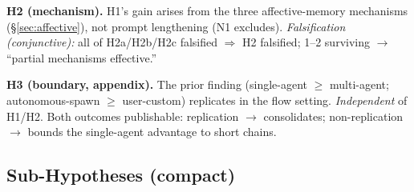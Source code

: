 \textbf{H2 (mechanism).} H1's gain arises from the three affective-memory mechanisms (\S\ref{sec:affective}), not prompt lengthening (N1 excludes). \emph{Falsification (conjunctive):} all of H2a/H2b/H2c falsified $\Rightarrow$ H2 falsified; 1--2 surviving $\to$ ``partial mechanisms effective.''

\textbf{H3 (boundary, appendix).} The prior finding (single-agent $\geq$ multi-agent; autonomous-spawn $\geq$ user-custom) replicates in the flow setting. \emph{Independent} of H1/H2. Both outcomes publishable: replication $\to$ consolidates; non-replication $\to$ bounds the single-agent advantage to short chains.

\subsection{Sub-Hypotheses (compact)}

